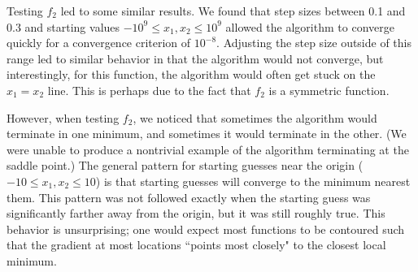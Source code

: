 \documentclass{article}
\begin{document}
Testing $f_2$ led to some similar results. We found that step sizes between 0.1 and 0.3 and starting values $-10^{9} \le x_1, x_2 \le 10^9$ allowed the algorithm to converge quickly for a convergence criterion of $10^{-8}$. Adjusting the step size outside of this range led to similar behavior in that the algorithm would not converge, but interestingly, for this function, the algorithm would often get stuck on the $x_1 = x_2$ line. This is perhaps due to the fact that $f_2$ is a symmetric function. 

However, when testing $f_2$, we noticed that sometimes the algorithm would terminate in one minimum, and sometimes it would terminate in the other. (We were unable to produce a nontrivial example of the algorithm terminating at the saddle point.) The general pattern for starting guesses near the origin ($-10 \le x_1, x_2 \le 10$) is that starting guesses will converge to the minimum nearest them. This pattern was not followed exactly when the starting guess was significantly farther away from the origin, but it was still roughly true. This behavior is unsurprising; one would expect most functions to be contoured such that the gradient at most locations ``points most closely" to the closest local minimum.
\end{document}

